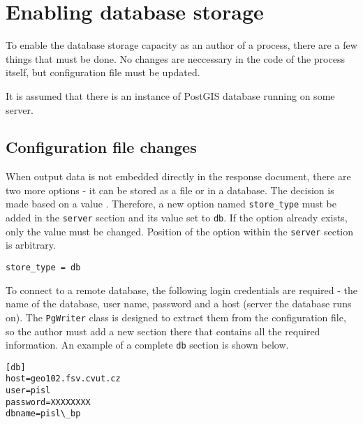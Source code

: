 \chapter{Enabling database storage} \label{appendix}
\label{Enabling-database-storage}

To enable the database storage capacity as an author of a process, there are a few things that must be done. No changes are neccessary in the code of the process itself, but configuration file must be updated. 

It is assumed that there is an instance of PostGIS database running on some server.


\section{Configuration file changes} \label{cfgchanges}

When output data is not embedded directly in the response document, there are two more options - it can be stored as a file or in a database. The decision is made based on a value . Therefore, a new option named \texttt{store\_type} must be added in the \texttt{server} section and its value set to \texttt{db}. If the option already exists, only the value must be changed. Position of the option within the \texttt{server} section is arbitrary.

\begin{verbatim}
store_type = db
\end{verbatim}


To connect to a remote database, the following login credentials are required - the name of the database, user name, password and a host (server the database runs on). The \texttt{PgWriter} class is designed to extract them from the configuration file, so the author must add a new section there that contains all the required information. An example of a complete  \texttt{db} section is shown below.

\begin{verbatim} 
[db]  
host=geo102.fsv.cvut.cz
user=pisl
password=XXXXXXXX
dbname=pisl\_bp
\end{verbatim}







